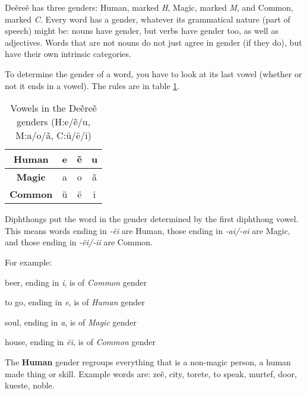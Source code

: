 Deẽreẽ has three genders: Human, marked \emph{H}, Magic, marked \emph{M}, and Common, marked
\emph{C}. Every word has a gender, whatever its grammatical nature (part of speech) might be: nouns
have gender, but verbs have gender too, as well as adjectives. Words that are not nouns do not just
agree in gender (if they do), but have their own intrinsic categories.

To determine the gender of a word, you have to look at its last vowel (whether or not it ends in a
vowel). The rules are in table \ref{tab:morph-genders}.

\begin{table}[h]
\begin{center}
\begin{tabular}{|c|ccc|}
\hline
\textbf{Human}  & e & ẽ & u\\\hline
\textbf{Magic}  & a & o & ã\\\hline
\textbf{Common} & ü & ë & i\\\hline
\end{tabular}
\end{center}
\caption{Vowels in the Deẽreẽ genders (H:e/ẽ/u, M:a/o/ã, C:ü/ë/i)}
\label{tab:morph-genders}
\end{table}

Diphthongs put the word in the gender determined by the first diphthong vowel.
This means words ending in \emph{-ẽi} are Human, those ending in \emph{-ai/-oi} are Magic, and those ending in \emph{-ëi/-ii} are Common.

For example:
\begin{description}
\item[\gls{zhalbraki}] beer, ending in \emph{i}, is of \emph{Common} gender
\item[\gls{drete}] to go, ending in \emph{e}, is of \emph{Human} gender
\item[\gls{magra}] soul, ending in \emph{a}, is of \emph{Magic} gender
\item[\gls{shëi}] house, ending in \emph{ëi}, is of \emph{Common} gender
\end{description}

The \textbf{Human} gender regroups everything that is a non-magic person, a human made thing or
skill. Example words are: \gls{zeẽ}, city, 
\gls{torete}, to speak, \gls{murtef}, door, \gls{kueste},
noble.

